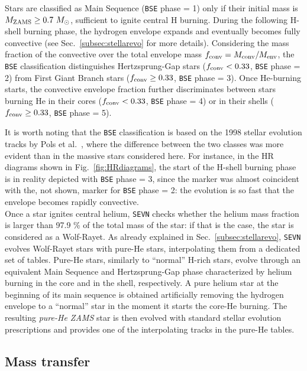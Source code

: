 \documentclass[a4paper,titlepage]{book}     	%
\newcommand{\sun}{\ensuremath{_\odot}}
\newcommand{\mzams}{M_\textup{ZAMS}}
\newcommand{\msun}{\ensuremath{M\sun}}
\begin{document}
Stars are classified as Main Sequence (\texttt{BSE} phase = 1) only if their initial mass is $\mzams \geq 0.7~\msun$, sufficient to ignite central H burning. During the following H-shell burning phase, the hydrogen envelope expands and eventually becomes fully convective (see Sec.\ \ref{subsec:stellarevo} for more details). Considering the mass fraction of the convective over the total envelope mass $f_{\rm conv}= M_{\rm conv}/M_{\rm env}$, the \texttt{BSE} classification distinguishes Hertzsprung-Gap stars ($f_{\rm conv} < 0.33$, \texttt{BSE} phase = 2) from First Giant Branch stars ($f_{\rm conv} \geq 0.33$, \texttt{BSE} phase = 3).  Once He-burning starts, the convective envelope fraction further discriminates between stars burning He in their cores ($f_{\rm conv} < 0.33$, \texttt{BSE} phase = 4) or in their shells ($f_{\rm conv} \geq 0.33$, \texttt{BSE} phase = 5).

It is worth noting that the \texttt{BSE} classification is based on the 1998 stellar evolution tracks by Pols et al.\ \cite{Pols1998evotracks}, where the difference between the two classes was more evident than in the massive stars considered here. For instance, in the HR diagrams shown in Fig.\ \ref{fig:HRdiagrams}, the start of the H-shell burning phase is in reality depicted with \texttt{BSE} phase = 3, since the marker was almost coincident with the, not shown, marker for \texttt{BSE} phase = 2: the evolution is so fast that the envelope becomes rapidly convective. \\

Once a star ignites central helium, \texttt{SEVN} checks whether the helium mass fraction is larger than 97.9 \% of the total mass of the star: if that is the case, the star is considered as a Wolf-Rayet. As already explained in Sec.\ \ref{subsec:stellarevo}, \texttt{SEVN} evolves Wolf-Rayet stars with pure-He stars, interpolating them from a dedicated set of tables. Pure-He stars, similarly to ``normal'' H-rich stars, evolve through an equivalent Main Sequence and Hertzsprung-Gap phase characterized by helium burning in the core and in the shell, respectively. A pure helium star at the beginning of its main sequence is obtained artificially removing the hydrogen envelope to a ``normal'' star in the moment it starts the core-He burning. The resulting \emph{pure-He ZAMS} star is then evolved with standard stellar evolution prescriptions and provides one of the interpolating tracks in the pure-He tables.



\subsection{Mass transfer}\label{subsec:masstransferSEVN}
\end{document}
